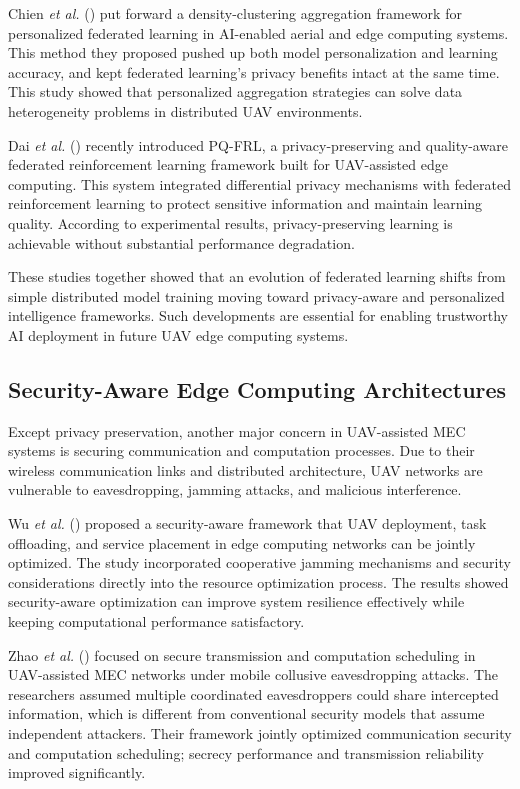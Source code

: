 \documentclass[a4paper, 12pt]{article}
\begin{document}
Chien \textit{et al.} (\cite{Chien2025}) put forward a density-clustering aggregation framework for personalized federated learning in AI-enabled aerial and edge computing systems. This method they proposed pushed up both model personalization and learning accuracy, and kept federated learning's privacy benefits intact at the same time. This study showed that personalized aggregation strategies can solve data heterogeneity problems in distributed UAV environments.

Dai \textit{et al.} (\cite{Dai2026}) recently introduced PQ-FRL, a privacy-preserving and quality-aware federated reinforcement learning framework built for UAV-assisted edge computing. This system integrated differential privacy mechanisms with federated reinforcement learning to protect sensitive information and maintain learning quality. According to experimental results, privacy-preserving learning is achievable without substantial performance degradation.

These studies together showed that an evolution of federated learning shifts from simple distributed model training moving toward privacy-aware and personalized intelligence frameworks. Such developments are essential for enabling trustworthy AI deployment in future UAV edge computing systems.

\subsection*{Security-Aware Edge Computing Architectures}
Except privacy preservation, another major concern in UAV-assisted MEC systems is securing communication and computation processes. Due to their wireless communication links and distributed architecture, UAV networks are vulnerable to eavesdropping, jamming attacks, and malicious interference.

Wu \textit{et al.} (\cite{Wu2025Security}) proposed a security-aware framework that UAV deployment, task offloading, and service placement in edge computing networks can be jointly optimized. The study incorporated cooperative jamming mechanisms and security considerations directly into the resource optimization process. The results showed security-aware optimization can improve system resilience effectively while keeping computational performance satisfactory.

Zhao \textit{et al.} (\cite{Zhao2025SecureTransmission}) focused on secure transmission and computation scheduling in UAV-assisted MEC networks under mobile collusive eavesdropping attacks. The researchers assumed multiple coordinated eavesdroppers could share intercepted information, which is different from conventional security models that assume independent attackers. Their framework jointly optimized communication security and computation scheduling; secrecy performance and transmission reliability improved significantly.
\end{document}
